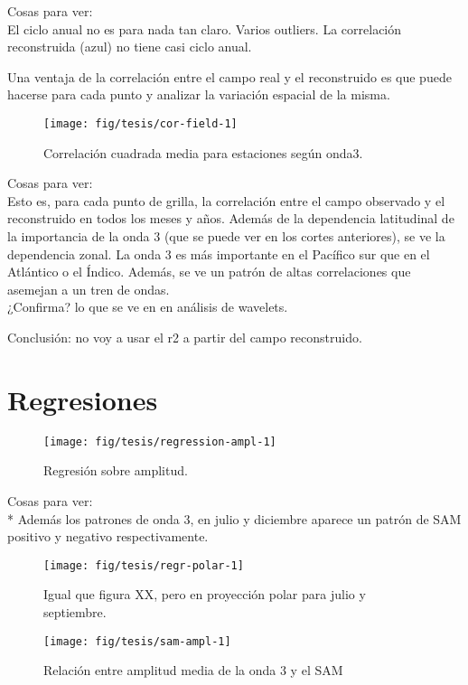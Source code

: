 \documentclass[spanish,a4paper]{book}
\begin{document}
Cosas para ver:\\
El ciclo anual no es para nada tan claro. Varios outliers. La
correlación reconstruida (azul) no tiene casi ciclo anual.

Una ventaja de la correlación entre el campo real y el reconstruido es
que puede hacerse para cada punto y analizar la variación espacial de la
misma.

\begin{figure}
\texttt{[image: fig/tesis/cor-field-1]} \caption{Correlación cuadrada media para estaciones según onda3.}\label{fig:cor-field}
\end{figure}

Cosas para ver:\\
Esto es, para cada punto de grilla, la correlación entre el campo
observado y el reconstruido en todos los meses y años. Además de la
dependencia latitudinal de la importancia de la onda 3 (que se puede ver
en los cortes anteriores), se ve la dependencia zonal. La onda 3 es más
importante en el Pacífico sur que en el Atlántico o el Índico. Además,
se ve un patrón de altas correlaciones que asemejan a un tren de
ondas.\\
¿Confirma? lo que se ve en en análisis de wavelets.

Conclusión: no voy a usar el r2 a partir del campo reconstruido.

\section{Regresiones}\label{regresiones}

\begin{figure}

{\centering \texttt{[image: fig/tesis/regression-ampl-1]} 

}

\caption{Regresión sobre amplitud.}\label{fig:regression-ampl}
\end{figure}

Cosas para ver:\\
* Además los patrones de onda 3, en julio y diciembre aparece un patrón
de SAM positivo y negativo respectivamente.

\begin{figure}
\texttt{[image: fig/tesis/regr-polar-1]} \caption{Igual que figura XX, pero en proyección polar para julio y septiembre.}\label{fig:regr-polar}
\end{figure}

\begin{figure}
\texttt{[image: fig/tesis/sam-ampl-1]} \caption{Relación entre amplitud media de la onda 3 y el SAM}\label{fig:sam-ampl}
\end{figure}
\end{document}
